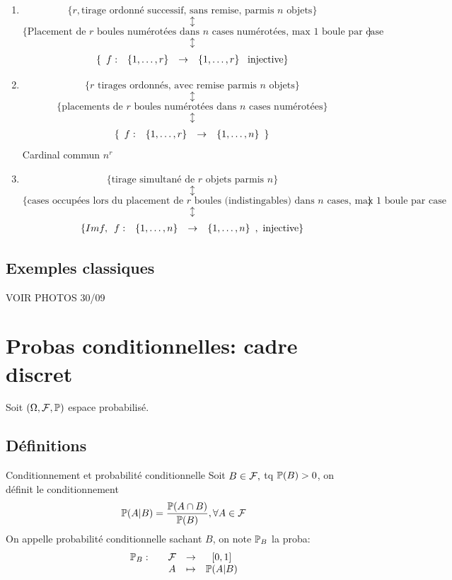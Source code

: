 \documentclass[]{report}
\begin{document}
\begin{ex}{}{}
    \begin{enumerate}
        \item \[\{r,\text{tirage ordonné successif, sans remise, parmis $n$ objets}\}\]
              \[\updownarrow\]
              \[\{\text{Placement de $r$ boules numérotées dans $n$ cases numérotées, max $1$ boule par case}\}\]
              \[\updownarrow\]
              \[\{\begin{array}{ccccc} f : & \{1,\ldots,r\} & \to & \{1,\ldots,r\} \end{array}\text{ injective}\}\]
        \item \[\{r\text{ tirages ordonnés, avec remise parmis $n$ objets}\}\]
              \[\updownarrow\]
              \[\{\text{placements de $r$ boules numérotées dans $n$ cases numérotées}\}\]
              \[\updownarrow\]
              \[\{\begin{array}{ccccc} f : & \{1,\ldots,r\} & \to & \{1,\ldots,n\} \end{array}\}\]
              Cardinal commun $n^r$
        \item \[\{\text{tirage simultané de $r$ objets parmis $n$}\}\]
              \[\updownarrow\]
              \[\{\text{cases occupées lors du placement de $r$ boules (indistingables) dans $n$ cases, max $1$ boule par case}\}\]
              \[\updownarrow\]
              \[\{Im f,\begin{array}{ccccc} f : & \{1,\ldots,n\} & \to & \{1,\ldots,n\} \end{array},\text{ injective}\}\]
    \end{enumerate}
\end{ex}

\subsection{Exemples classiques}

VOIR PHOTOS 30/09

\section{Probas conditionnelles: cadre discret}

Soit $(\Omega,\mathcal{F},\mathbb{P})$ espace probabilisé.

\subsection{Définitions}

\begin{df}{Conditionnement et probabilité conditionnelle}{}
    Soit $B\in \mathcal{F},$ tq $\mathbb{P}(B)>0$, on définit le conditionnement
    \[\mathbb{P}(A|B)=\frac{\mathbb{P}(A\cap B)}{\mathbb{P}( B)},\forall A\in \mathcal{F}\]
    On appelle probabilité conditionnelle sachant $B$, on note $\mathbb{P}_B$ la proba:
    \[\begin{array}{ccccc} \mathbb{P}_B : & & \mathcal{F} & \to & [0,1] \\ & & A & \mapsto & \mathbb{P}(A|B) \end{array}\]
\end{df}
\end{document}
